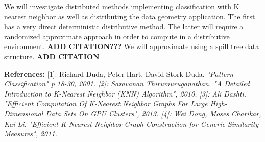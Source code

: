 \vspace{5 mm}
\noindent
We will investigate distributed methods implementing classification with 
K nearest neighbor as well as distributing the data geometry application. The 
first has a very direct deterministic distributive method. The latter will 
require a randomized approximate approach in order to compute in a distributive 
environment.
\textbf{ADD CITATION???} 
We will approximate using a spill tree data structure.
\textbf{ADD CITATION}


\textbf{References:}
[1]: Richard Duda, Peter Hart, David Stork Duda. \it{"Pattern Classification"} p.18-30, 2001.
[2]: Saravanan Thirumuruganathan. \it{"A Detailed Introduction to K-Nearest Neighbor (KNN) Algorithm"}, 2010. 
[3]: Ali Dashti. \it{"Efficient Computation Of K-Nearest Neighbor Graphs For Large High-Dimensional Data Sets On GPU Clusters"}, 2013.
[4]: Wei Dong, Moses Charikar, Kai Li. \it{"Efﬁcient K-Nearest Neighbor Graph Construction for Generic Similarity Measures"}, 2011.
